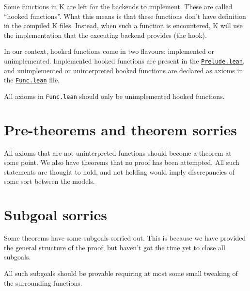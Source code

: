 Some functions in K are left for the backends to implement. These are called
``hooked functions''. What this means is that these functions don't have
definition in the compiled K files. Instead, when such a function is
encountered, K will use the implementation that the executing backend provides
(the hook).

In our context, hooked functions come in two flavours: implemented or
unimplemented. Implemented hooked functions are present in the
\href{https://runtimeverification.github.io/evm-equivalence/docs/EvmEquivalence/KEVM2Lean/Prelude.html}{\texttt{Prelude.lean}},
and unimplemented or uninterpreted hooked functions are declared as axioms in
the
\href{https://runtimeverification.github.io/evm-equivalence/docs/EvmEquivalence/KEVM2Lean/Func.html}{\texttt{Func.lean}}
file.

All axioms in \texttt{Func.lean} should only be unimplemented hooked functions.

\section{Pre-theorems and theorem sorries}

All axioms that are not uninterpreted functions should become a theorem at some
point. We also have theorems that no proof has been attempted. All such
statements are thought to hold, and not holding would imply discrepancies of
some sort between the models.

\section{Subgoal sorries}

Some theorems have some subgoals sorried out. This is because we have
provided the general structure of the proof, but haven't got the time yet to
close all subgoals.

All such subgoals should be provable requiring at most some small tweaking of
the surrounding functions.
